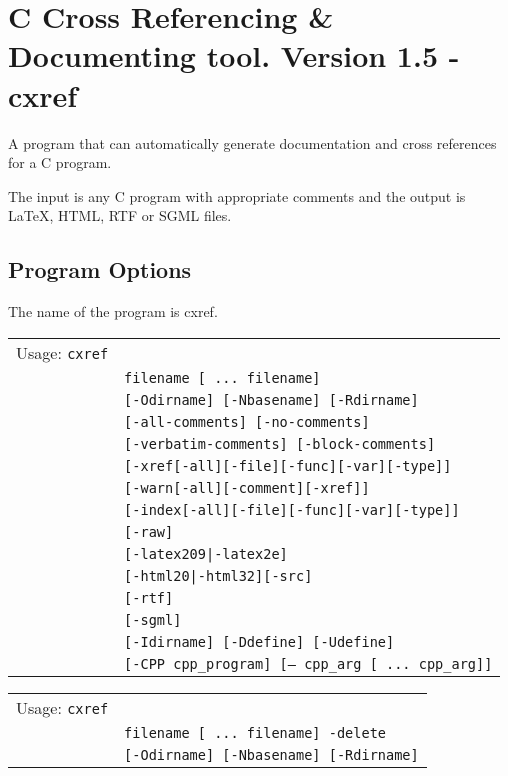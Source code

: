 \documentclass{report}
\begin{document}


\chapter{C Cross Referencing \& Documenting tool. Version 1.5 - cxref}

A program that can automatically generate documentation and cross references for
a C program.

The input is any C program with appropriate comments and the output is \LaTeX ,
HTML, RTF or SGML files.

\section{Program Options}

The name of the program is cxref.

\smallskip

\begin{tabular}{ll}
Usage: {\tt cxref} & \\
& {\tt filename [ ... filename]} \\
& {\tt [-Odirname] [-Nbasename] [-Rdirname]} \\
& {\tt [-all-comments] [-no-comments]} \\
& {\tt [-verbatim-comments] [-block-comments]} \\
& {\tt [-xref[-all][-file][-func][-var][-type]]} \\
& {\tt [-warn[-all][-comment][-xref]]} \\
& {\tt [-index[-all][-file][-func][-var][-type]]} \\
& {\tt [-raw]} \\
& {\tt [-latex209|-latex2e]} \\
& {\tt [-html20|-html32][-src]} \\
& {\tt [-rtf]} \\
& {\tt [-sgml]} \\
& {\tt [-Idirname] [-Ddefine] [-Udefine]} \\
& {\tt [-CPP cpp\_program] [-- cpp\_arg [ ... cpp\_arg]]} \\
\end{tabular}
\begin{tabular}{ll}
Usage: {\tt cxref} & \\
& {\tt filename [ ... filename] -delete} \\
& {\tt [-Odirname] [-Nbasename] [-Rdirname]} \\
\end{tabular}
\end{document}
